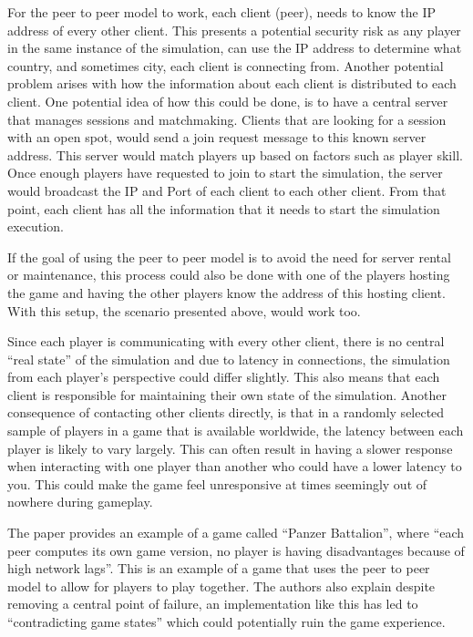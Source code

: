 For the peer to peer model to work, each client (peer), needs to know the IP address of every other client. This presents a potential security risk as any player in the same instance of the simulation, can use the IP address to determine what country, and sometimes city, each client is connecting from. Another potential problem arises with how the information about each client is distributed to each client. One potential idea of how this could be done, is to have a central server that manages sessions and matchmaking. Clients that are looking for a session with an open spot, would send a join request message to this known server address. This server would match players up based on factors such as player skill. Once enough players have requested to join to start the simulation, the server would broadcast the IP and Port of each client to each other client. From that point, each client has all the information that it needs to start the simulation execution.

If the goal of using the peer to peer model is to avoid the need for server rental or maintenance, this process could also be done with one of the players hosting the game and having the other players know the address of this hosting client. With this setup, the scenario presented above, would work too.

Since each player is communicating with every other client, there is no central ``real state'' of the simulation and due to latency in connections, the simulation from each player's perspective could differ slightly. This also means that each client is responsible for maintaining their own state of the simulation. Another consequence of contacting other clients directly, is that in a randomly selected sample of players in a game that is available worldwide, the latency between each player is likely to vary largely. This can often result in having a slower response when interacting with one player than another who could have a lower latency to you. This could make the game feel unresponsive at times seemingly out of nowhere during gameplay.

The paper  provides an example of a game called ``Panzer Battalion'', where ``each peer computes its own game version, no player is having disadvantages because of high network lags''. This is an example of a game that uses the peer to peer model to allow for players to play together. The authors also explain despite removing a central point of failure, an implementation like this has led to ``contradicting game states'' which could potentially ruin the game experience.


